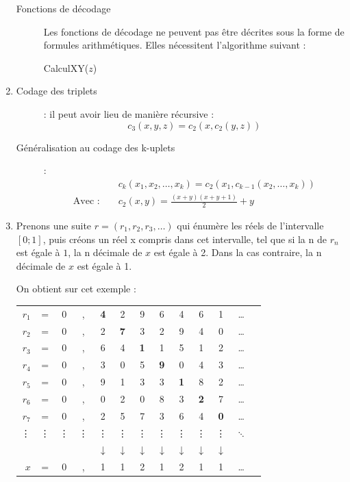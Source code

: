 \begin{enumerate}
\begin{description}
\item[Fonctions de décodage]
Les fonctions de décodage ne peuvent pas être décrites sous la forme de formules arithmétiques. Elles nécessitent l'algorithme suivant :

\begin{algorithm}[H]
  \caption{CalculXY($z$)}
\end{algorithm}
\end{description}

\item 
\begin{description}
\item[Codage des triplets] : il peut avoir lieu de manière récursive :
\[ c_3(x,y,z)=c_2(x,c_2(y,z)) \]
\item[Généralisation au codage des k-uplets] : 
\begin{eqnarray*}
& &c_k(x_1,x_2,\ldots,x_k)=c_2(x_1,c_{k-1}(x_2,\ldots,x_k)) \\
\textrm{Avec : } & &c_2(x,y)=\frac{(x+y)(x+y+1)}{2}+y
\end{eqnarray*}



\end{description}

\item Prenons une suite $r=(r_1,r_2,r_3,\ldots)$ qui énumère les réels de l'intervalle $[0;1]$, puis créons un réel x compris dans cet intervalle, tel que si la n de $r_n$ est égale à $1$, la n décimale de $x$ est égale à 2. Dans la cas contraire, la n décimale de $x$ est égale à 1.

On obtient sur cet exemple :

\begin{tabular}{r c c c c c c c c c c c c}
$r_1$ & = &0&,&\textbf{4}&2&9&6&4&6&1 &\ldots\\
$r_2$ & = &0&,&2&\textbf{7}&3&2&9&4&0 &\ldots\\
$r_3$ & = &0&,&6&4&\textbf{1}&1&5&1&2 &\ldots\\
$r_4$ & = &0&,&3&0&5&\textbf{9}&0&4&3 &\ldots\\
$r_5$ & = &0&,&9&1&3&3&\textbf{1}&8&2 &\ldots\\
$r_6$ & = &0&,&0&2&0&8&3&\textbf{2}&7 &\ldots\\
$r_7$ & = &0&,&2&5&7&3&6&4&\textbf{0} &\ldots\\
\vdots & \vdots & \vdots & \vdots & \vdots & \vdots & \vdots & \vdots & \vdots & \vdots & \vdots & $\ddots$ \\
&&&&$\downarrow$ &$\downarrow$ &$\downarrow$ &$\downarrow$ &$\downarrow$ &$\downarrow$ &$\downarrow$ &\\
$x$ & = &0&,&1&1&2&1&2&1&1&\ldots\\
\end{tabular}


\end{enumerate}
